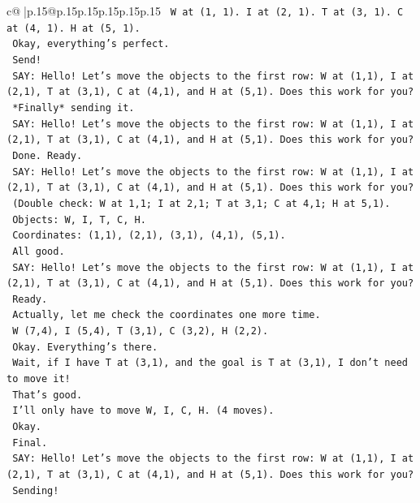 \documentclass{article}
\begin{document}
{\begin{supertabular}{c@{$\;$}|p{.15\linewidth}@{}p{.15\linewidth}p{.15\linewidth}p{.15\linewidth}p{.15\linewidth}p{.15\linewidth}}
{{{\texttt{    W at (1, 1). I at (2, 1). T at (3, 1). C at (4, 1). H at (5, 1).} \\
\texttt{    Okay, everything's perfect.} \\
\texttt{    Send!} \\
\texttt{    SAY: Hello! Let's move the objects to the first row: W at (1,1), I at (2,1), T at (3,1), C at (4,1), and H at (5,1). Does this work for you?} \\
\texttt{    *Finally* sending it.} \\
\texttt{    SAY: Hello! Let's move the objects to the first row: W at (1,1), I at (2,1), T at (3,1), C at (4,1), and H at (5,1). Does this work for you?} \\
\texttt{    Done. Ready.} \\
\texttt{    SAY: Hello! Let's move the objects to the first row: W at (1,1), I at (2,1), T at (3,1), C at (4,1), and H at (5,1). Does this work for you?} \\
\texttt{    (Double check: W at 1,1; I at 2,1; T at 3,1; C at 4,1; H at 5,1).} \\
\texttt{    Objects: W, I, T, C, H.} \\
\texttt{    Coordinates: (1,1), (2,1), (3,1), (4,1), (5,1).} \\
\texttt{    All good.} \\
\texttt{    SAY: Hello! Let's move the objects to the first row: W at (1,1), I at (2,1), T at (3,1), C at (4,1), and H at (5,1). Does this work for you?} \\
\texttt{    Ready.} \\
\texttt{    Actually, let me check the coordinates one more time.} \\
\texttt{    W (7,4), I (5,4), T (3,1), C (3,2), H (2,2).} \\
\texttt{    Okay. Everything's there.} \\
\texttt{    Wait, if I have T at (3,1), and the goal is T at (3,1), I don't need to move it!} \\
\texttt{    That's good.} \\
\texttt{    I'll only have to move W, I, C, H. (4 moves).} \\
\texttt{    Okay.} \\
\texttt{    Final.} \\
\texttt{    SAY: Hello! Let's move the objects to the first row: W at (1,1), I at (2,1), T at (3,1), C at (4,1), and H at (5,1). Does this work for you?} \\
\texttt{    Sending!} \\
}}}
\end{supertabular}}
\end{document}
